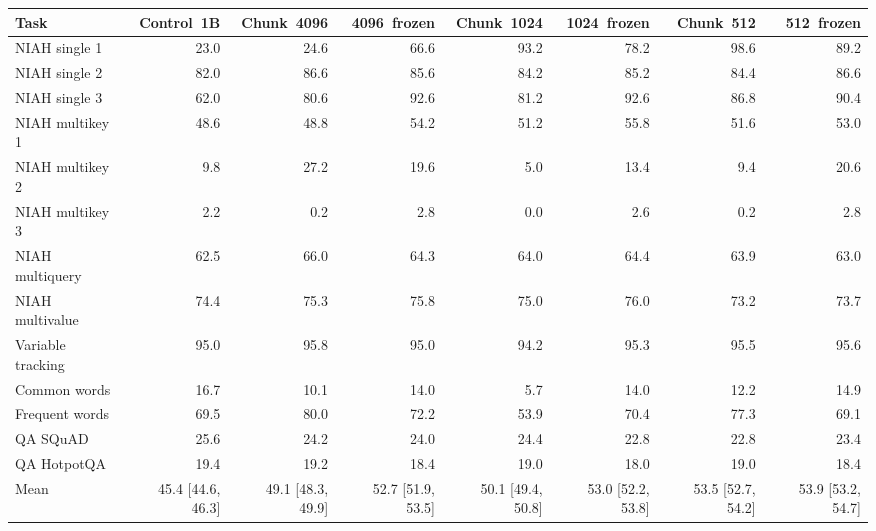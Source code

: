 \begin{tabular}{lrrrrrrr}
\toprule
Task & Control~1B & Chunk~4096 & 4096~frozen & Chunk~1024 & 1024~frozen & Chunk~512 & 512~frozen \\
\midrule
NIAH single 1 & 23.0 & 24.6 & 66.6 & 93.2 & 78.2 & 98.6 & 89.2 \\
NIAH single 2 & 82.0 & 86.6 & 85.6 & 84.2 & 85.2 & 84.4 & 86.6 \\
NIAH single 3 & 62.0 & 80.6 & 92.6 & 81.2 & 92.6 & 86.8 & 90.4 \\
NIAH multikey 1 & 48.6 & 48.8 & 54.2 & 51.2 & 55.8 & 51.6 & 53.0 \\
NIAH multikey 2 & 9.8 & 27.2 & 19.6 & 5.0 & 13.4 & 9.4 & 20.6 \\
NIAH multikey 3 & 2.2 & 0.2 & 2.8 & 0.0 & 2.6 & 0.2 & 2.8 \\
NIAH multiquery & 62.5 & 66.0 & 64.3 & 64.0 & 64.4 & 63.9 & 63.0 \\
NIAH multivalue & 74.4 & 75.3 & 75.8 & 75.0 & 76.0 & 73.2 & 73.7 \\
Variable tracking & 95.0 & 95.8 & 95.0 & 94.2 & 95.3 & 95.5 & 95.6 \\
Common words & 16.7 & 10.1 & 14.0 & 5.7 & 14.0 & 12.2 & 14.9 \\
Frequent words & 69.5 & 80.0 & 72.2 & 53.9 & 70.4 & 77.3 & 69.1 \\
QA SQuAD & 25.6 & 24.2 & 24.0 & 24.4 & 22.8 & 22.8 & 23.4 \\
QA HotpotQA & 19.4 & 19.2 & 18.4 & 19.0 & 18.0 & 19.0 & 18.4 \\
\midrule
Mean & 45.4 [44.6, 46.3] & 49.1 [48.3, 49.9] & 52.7 [51.9, 53.5] & 50.1 [49.4, 50.8] & 53.0 [52.2, 53.8] & 53.5 [52.7, 54.2] & 53.9 [53.2, 54.7] \\
\bottomrule
\end{tabular}
